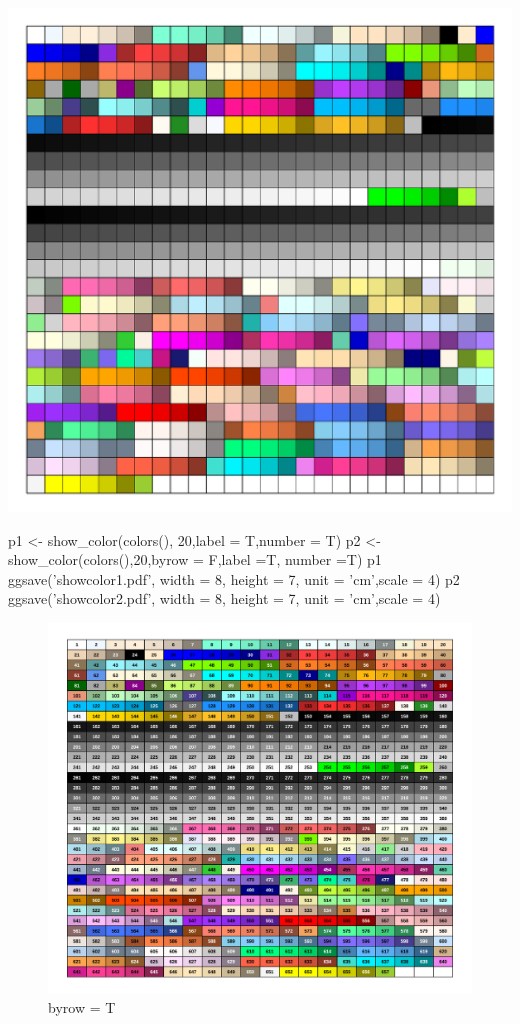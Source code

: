 \documentclass[10 pt,landscape]{article}
\begin{document}
\begin{multicols*}{3}
     \includegraphics[width = 0.95\linewidth] {showcol} 
     
     \begin{R}
p1 <- show_color(colors(), 20,label = T,number = T)
p2 <- show_color(colors(),20,byrow = F,label =T, number =T)
p1
ggsave('showcolor1.pdf', width = 8, height = 7, unit = 'cm',scale = 4)
p2
ggsave('showcolor2.pdf', width = 8, height = 7, unit = 'cm',scale = 4)
\end{R}
        \begin{figure}[H]
          \centering
       \includegraphics[width =1.1 \linewidth] {showcolor1} 
         \caption{byrow = T}
       \end{figure}
       

\end{multicols*}
\end{document}

